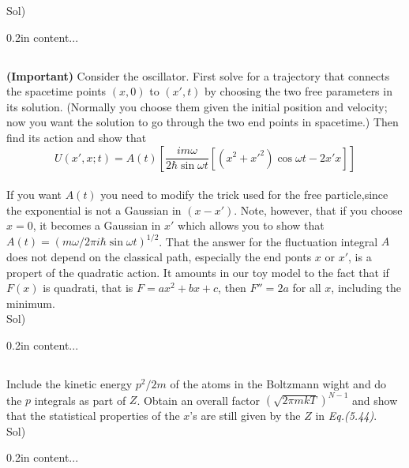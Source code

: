 \documentclass[paper=a4, fontsize=11pt]{scrartcl}
\numberwithin{equation}{section}
\numberwithin{figure}{section}
\numberwithin{table}{section}
\newenvironment{problem}{\subsection{}}{}
\newenvironment{solution}{Sol) \begin{adjustwidth}{0.2in}{}\vspace{0.1in}}{\end{adjustwidth}}
\begin{document}
\begin{solution}
	content...
\end{solution}

\vskip 0.3in

\begin{problem}
		\textbf{(Important)} Consider the oscillator. First solve for a trajectory that connects the spacetime points $(x,0)$ to $(x',t)$ by choosing the two free parameters in its solution. (Normally you choose them given the initial position and velocity; now you want the solution to go through the two end points in spacetime.) Then find its action and show that \\
		\begin{equation}
			U(x',x;t)=A(t)\left[ \frac{im\omega}{2\hbar \sin{\omega t}}\left[(x^2 + x'^2)\cos{\omega t}-2x'x\right]\right]
		\nonumber
		\end{equation} \\
		If you want $A(t)$ you need to modify the trick used for the free particle,since the exponential is not a Gaussian in $(x-x')$. Note, however, that if you choose $x=0$, it becomes a Gaussian in $x'$ which allows you to show that $A(t)=(m\omega/2\pi i \hbar \sin{\omega t})^{1/2}$. That the answer for the fluctuation integral $A$ does not depend on the classical path, especially the end ponts $x$ or $x'$, is a propert of the quadratic action. It amounts in our toy model to the fact that if $F(x)$ is quadrati, that is $F=ax^2+bx+c$, then $F'' = 2a$ for all $x$, including the minimum.  
\end{problem}\\

\begin{solution}
	content...
\end{solution}

\vskip 0.3in

\begin{problem}
	Include the kinetic energy $p^2/2m$ of the atoms in the Boltzmann wight and do the $p$ integrals as part of $Z$. Obtain an overall factor $( \sqrt{2\pi mkT} )^{N-1}$ and show that the statistical properties of the $x$'s are still given by the $Z$ in \textit{Eq.(5.44)}.
\end{problem}\\

\begin{solution}
	content...
\end{solution}

\vskip 0.3in
\end{document}
